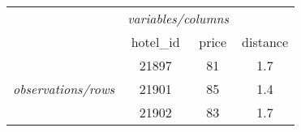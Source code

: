\begin{tabular}{lccc}
\toprule
&   \multicolumn{2}{c}{\textit{variables/columns}}   \\
& hotel\_id & price & distance 
\tabularnewline
\midrule
\addlinespace[1.5ex]
& 21897 & 81 & 1.7
\tabularnewline
{\textit{observations/rows}} & 21901 & 85 & 1.4 
\tabularnewline
& 21902 & 83 & 1.7 
\tabularnewline
\bottomrule 
\end{tabular}



